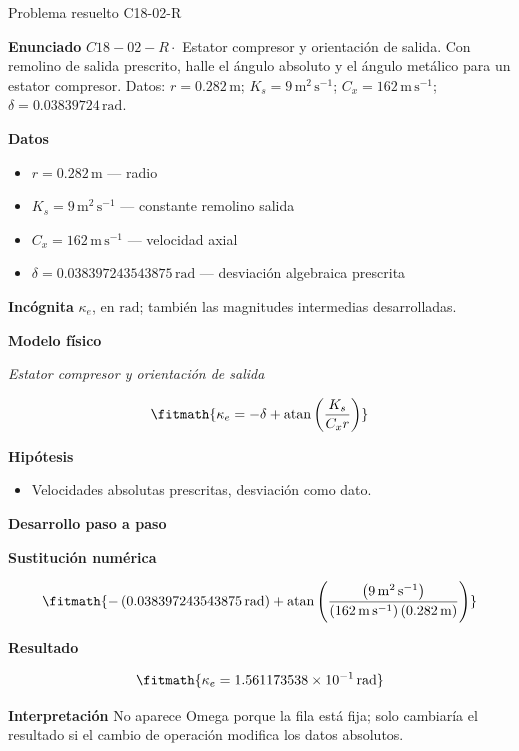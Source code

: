 \documentclass[10pt,openany]{book}
\begin{document}
\begin{studiumworked}{Problema resuelto C18-02-R}


\noindent\textbf{Enunciado}
\(C18-02-R \cdot\) Estator compresor y orientación de salida. Con remolino de salida prescrito, halle el ángulo absoluto y el ángulo metálico para un estator compresor. Datos: \(r=0.282\, \mathrm{m}\); \(K_s=9\, \mathrm{m}^{2}\,\mathrm{s}^{-1}\); \(C_x=162\, \mathrm{m}\,\mathrm{s}^{-1}\); \(\delta=0.03839724\, \mathrm{rad}\).

\noindent\textbf{Datos}
\begin{itemize}
\item $r = 0.282\,\mathrm{m}$ — radio
\item $K_s = 9\,\mathrm{m}^{2}\,\mathrm{s}^{-1}$ — constante remolino salida
\item $C_x = 162\,\mathrm{m}\,\mathrm{s}^{-1}$ — velocidad axial
\item $\delta = 0.038397243543875\,\mathrm{rad}$ — desviación algebraica prescrita
\end{itemize}

\noindent\textbf{Incógnita}
$\kappa_e$, en $\mathrm{rad}$; también las magnitudes intermedias desarrolladas.

\noindent\textbf{Modelo físico}

\noindent\textit{Estator compresor y orientación de salida}

\[
\fitmath{\kappa_e=- \delta + \operatorname{atan}{\left(\frac{K_s}{C_x r} \right)}}
\]

\noindent\textbf{Hipótesis}
\begin{itemize}
\item Velocidades absolutas prescritas, desviación como dato.
\end{itemize}

\noindent\textbf{Desarrollo paso a paso}



\noindent\textbf{Sustitución numérica}

\[
\fitmath{- \left(0.038397243543875\,\mathrm{rad}\right) + \operatorname{atan}{\left(\frac{\left(9\,\mathrm{m}^{2}\,\mathrm{s}^{-1}\right)}{\left(162\,\mathrm{m}\,\mathrm{s}^{-1}\right) \left(0.282\,\mathrm{m}\right)} \right)}}
\]

\noindent\textbf{Resultado}

\[
\fitmath{\kappa_e=1.561173538\times10^{-1}\,\mathrm{rad}}
\]

\noindent\textbf{Interpretación}
No aparece Omega porque la fila está fija; solo cambiaría el resultado si el cambio de operación modifica los datos absolutos.


\end{studiumworked}
\end{document}
